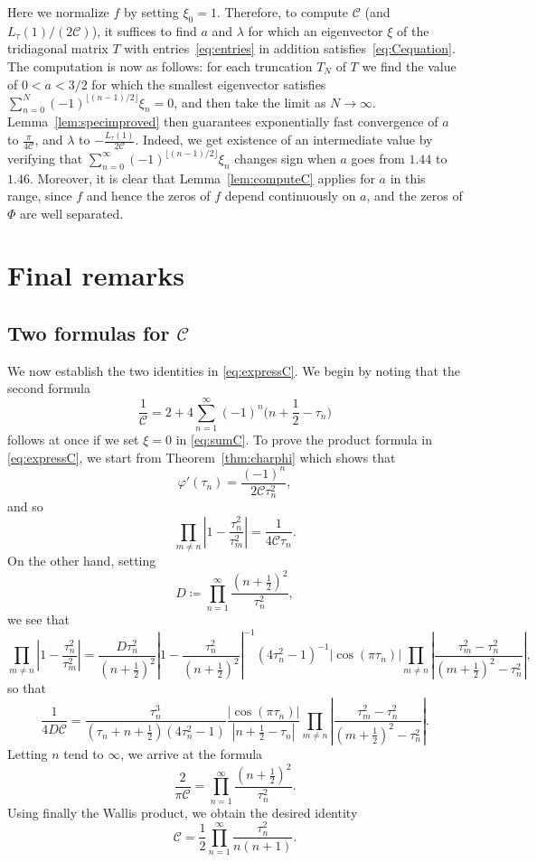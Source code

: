 \documentclass[12pt]{amsart}
\theoremstyle{plain}
\numberwithin{equation}{section}
\theoremstyle{definition}
\renewcommand{\phi}{\varphi}
\newcommand{\Cone}{\mathscr{C}}
\begin{document}
Here we normalize $f$ by setting $\xi_0=1$. Therefore, to compute $\Cone$ (and $L_{\tau}(1)/(2\Cone)$), it suffices to find $a$ and $\lambda$ for which an eigenvector $\xi$ of the tridiagonal matrix $T$ with entries~\eqref{eq:entries} in addition satisfies~\eqref{eq:Cequation}. The computation is now as follows: for each truncation $T_N$ of $T$ we find the value of $0<a<3/2$ for which the smallest eigenvector satisfies $\sum_{n=0}^{N}(-1)^{\lfloor (n-1)/2\rfloor}\xi_n=0$, and then take the limit as $N\to\infty$. Lemma~\ref{lem:specimproved} then guarantees exponentially fast convergence of $a$ to $\frac{\pi}{4\Cone}$, and $\lambda$ to $-\frac{L_{\tau}(1)}{2\Cone}$. Indeed, we get existence of an intermediate value by verifying that $\sum_{n=0}^{\infty}(-1)^{\lfloor (n-1)/2\rfloor}\xi_n$ changes sign when $a$ goes from $1.44$ to $1.46$. Moreover, it is clear that Lemma~\ref{lem:computeC} applies for $a$ in this range, since $f$ and hence the zeros of $f$ depend continuously on $a$, and the zeros of $\Phi$ are well separated. 

\section{Final remarks} \label{sec:final}
\subsection{Two formulas for \texorpdfstring{$\Cone$}{C}}
\label{sec:formulasC}
We now establish the two identities in \eqref{eq:expressC}. We begin by noting that the second formula 
\[ \frac{1}{\Cone}=2+4\sum_{n=1}^\infty (-1)^n \Big(n+\frac12-\tau_n\Big) \] 
follows at once if we set $\xi=0$ in \eqref{eq:sumC}. To prove the product formula in \eqref{eq:expressC}, we start from 
Theorem~\ref{thm:charphi} which shows that
\[ \phi'(\tau_n)=\frac{(-1)^n}{2\Cone \tau_n^2}, \]
and so
\[  \prod_{m\neq n} \left|1-\frac{\tau_n^2}{\tau_m^2}\right| = \frac{1}{4 \Cone \tau_n}.\]
On the other hand, setting
\[ D\coloneqq \prod_{n=1}^{\infty}\frac{(n+\frac12)^2}{\tau_n^2}, \]
we see that
\[  \prod_{m\neq n} \left|1-\frac{\tau_n^2}{\tau_m^2}\right|=
\frac{D\tau_n^2}{(n+\frac12)^2} \left|1-\frac{\tau_n^2}{(n+\frac12)^2}\right|^{-1}
(4\tau_n^2-1)^{-1} |\cos (\pi \tau_n)| \prod_{m\neq n}
\left|\frac{\tau_m^2-\tau_n^2}{(m+\frac12)^2-\tau_n^2}\right|,\]
so that
\[ \frac{1}{4D \Cone}= \frac{\tau_n^3}{(\tau_n+n+\frac12)(4\tau_n^2-1)}  \frac{|\cos (\pi
\tau_n)|}{|n+\frac12-\tau_n|} \prod_{m\neq n}
\left|\frac{\tau_m^2-\tau_n^2}{(m+\frac12)^2-\tau_n^2}\right|   .\]
Letting $n$ tend to $\infty$, we arrive at the formula
\[ \frac{2}{\pi \Cone}=\prod_{n=1}^\infty \frac{(n+\frac12)^2}{\tau_n^2}. \]
Using finally the Wallis product, we obtain the desired identity 
	\[\Cone = \frac{1}{2}\prod_{n=1}^\infty \frac{\tau_n^2}{n(n+1)}. \]
\end{document}
